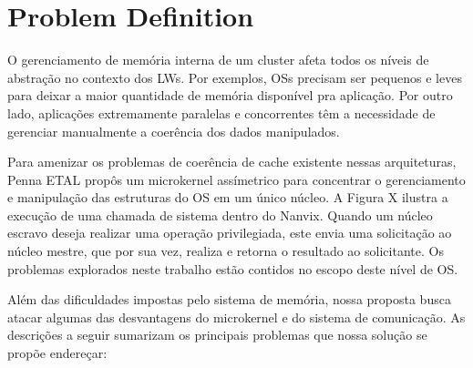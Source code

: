 \section{Problem Definition}
\label{sec:problem}

	O gerenciamento de memória interna de um cluster afeta todos os níveis de
	abstração no contexto dos LWs. Por exemplos, OSs precisam ser pequenos
	e leves para deixar a maior quantidade de memória disponível pra aplicação.
	Por outro lado, aplicações extremamente paralelas e concorrentes têm
	a necessidade de gerenciar manualmente a coerência dos dados manipulados.

	Para amenizar os problemas de coerência de
	cache existente nessas arquiteturas, Penna ETAL propôs um microkernel
	assímetrico para concentrar o gerenciamento e manipulação das estruturas do
	OS em um único núcleo. A Figura X ilustra a execução de uma chamada de
	sistema dentro do Nanvix. Quando um núcleo escravo deseja realizar uma operação
	privilegiada, este envia uma solicitação ao núcleo mestre, que por sua vez,
	realiza e retorna o resultado ao solicitante. Os problemas explorados neste
	trabalho estão contidos no escopo deste nível de OS.

	Além das dificuldades impostas pelo sistema de memória, nossa proposta
	busca atacar algumas das desvantagens do microkernel e do sistema de
	comunicação. As descrições a seguir sumarizam os principais problemas que nossa
	solução se propõe endereçar:

